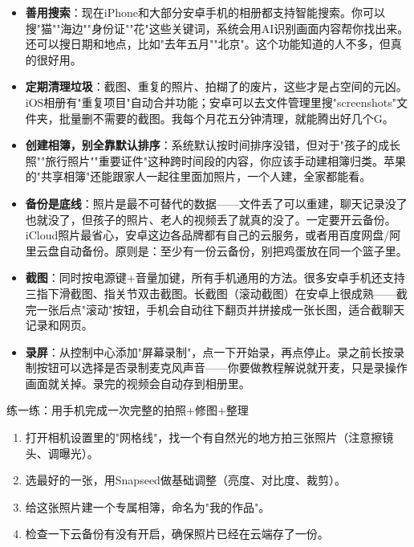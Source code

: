 \begin{itemize}
  \item \textbf{善用搜索}：现在iPhone和大部分安卓手机的相册都支持智能搜索。你可以搜"猫""海边""身份证""花"这些关键词，系统会用AI识别画面内容帮你找出来。还可以搜日期和地点，比如"去年五月""北京"。这个功能知道的人不多，但真的很好用。
  \item \textbf{定期清理垃圾}：截图、重复的照片、拍糊了的废片，这些才是占空间的元凶。iOS相册有"重复项目"自动合并功能；安卓可以去文件管理里搜"screenshots"文件夹，批量删不需要的截图。我每个月花五分钟清理，就能腾出好几个G。
  \item \textbf{创建相簿，别全靠默认排序}：系统默认按时间排序没错，但对于"孩子的成长照""旅行照片""重要证件"这种跨时间段的内容，你应该手动建相簿归类。苹果的"共享相簿"还能跟家人一起往里面加照片，一个人建，全家都能看。
  \item \textbf{备份是底线}：照片是最不可替代的数据——文件丢了可以重建，聊天记录没了也就没了，但孩子的照片、老人的视频丢了就真的没了。一定要开云备份。iCloud照片最省心，安卓这边各品牌都有自己的云服务，或者用百度网盘/阿里云盘自动备份。原则是：至少有一份云备份，别把鸡蛋放在同一个篮子里。
\end{itemize}


\begin{itemize}
  \item \textbf{截图}：同时按电源键+音量加键，所有手机通用的方法。很多安卓手机还支持三指下滑截图、指关节双击截图。长截图（滚动截图）在安卓上很成熟——截完一张后点"滚动"按钮，手机会自动往下翻页并拼接成一张长图，适合截聊天记录和网页。
  \item \textbf{录屏}：从控制中心添加"屏幕录制"，点一下开始录，再点停止。录之前长按录制按钮可以选择是否录制麦克风声音——你要做教程解说就开麦，只是录操作画面就关掉。录完的视频会自动存到相册里。
\end{itemize}

\begin{tcbpractice}{练一练：用手机完成一次完整的拍照+修图+整理}
\begin{enumerate}
  \item 打开相机设置里的"网格线"，找一个有自然光的地方拍三张照片（注意擦镜头、调曝光）。
  \item 选最好的一张，用Snapseed做基础调整（亮度、对比度、裁剪）。
  \item 给这张照片建一个专属相簿，命名为"我的作品"。
  \item 检查一下云备份有没有开启，确保照片已经在云端存了一份。
\end{enumerate}

\end{tcbpractice}
